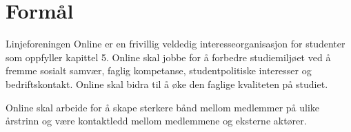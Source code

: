 \chapter{Formål}

Linjeforeningen Online  er en frivillig veldedig interesseorganisasjon for studenter som oppfyller kapittel 5. Online skal jobbe for å forbedre studiemiljøet ved å fremme sosialt samvær, faglig kompetanse, studentpolitiske interesser og bedriftskontakt. Online skal bidra til å øke den faglige kvaliteten på studiet.

Online skal arbeide for å skape sterkere bånd mellom medlemmer på ulike årstrinn og være kontaktledd mellom medlemmene og eksterne aktører. 
